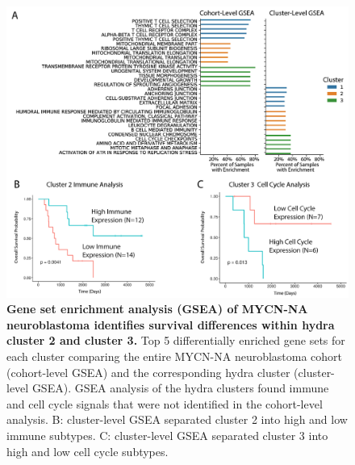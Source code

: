 \documentclass[10pt,letterpaper]{article}
\begin{document}
\begin{figure}[!h]
	\includegraphics[width=\textwidth]{img/PNG/SubCluster-Analysis-V2@2x.png}
	\caption{{\bf Gene set enrichment analysis (GSEA) of MYCN-NA neuroblastoma identifies survival differences within hydra cluster 2 and cluster 3.}
		Top 5 differentially enriched gene sets for each cluster comparing the entire MYCN-NA neuroblastoma cohort (cohort-level GSEA) and the corresponding hydra cluster (cluster-level GSEA). GSEA analysis of the hydra clusters found immune and cell cycle signals that were not identified in the cohort-level analysis. B: cluster-level GSEA separated cluster 2 into high and low immune subtypes. C: cluster-level GSEA separated cluster 3 into high and low cell cycle subtypes.}
	\label{subcluster}
\end{figure}
\end{document}
